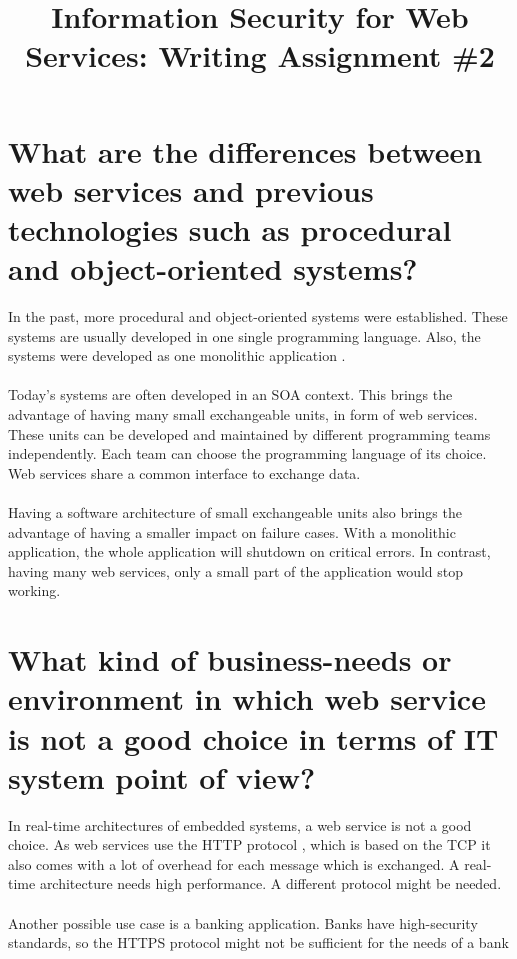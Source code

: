 \documentclass[conference,compsoc,onecolumn]{IEEEtran}
\title{Information Security for Web Services: Writing Assignment \#2}
\author{
  \IEEEauthorblockN{Christoph Stach}
  \IEEEauthorblockA{
    NTUST: National Taiwan University of Science and Technology\\
    Student ID: E10815023\\
    Email: christoph.stach@gmail.com
  }
}
\begin{document}
  \maketitle

  
  \section{What are the differences between web services and previous technologies such as procedural and object-oriented systems?}

    In the past, more procedural and object-oriented systems were established. These systems are usually developed in one single programming language. Also, the systems were developed as one monolithic application \cite{monolitharchitecture}.\\
    \\
    Today's systems are often developed in an SOA context. This brings the advantage of having many small exchangeable units, in form of web services. These units can be developed and maintained by different programming teams independently. Each team can choose the programming language of its choice. Web services share a common interface to exchange data.\\
    \\
    Having a software architecture of small exchangeable units also brings the advantage of having a smaller impact on failure cases. With a monolithic application, the whole application will shutdown on critical errors. In contrast, having many web services, only a small part of the application would stop working.
    
  \section{What kind of business-needs or environment in which web service is not a good choice in terms of IT system point of view?}

    In real-time architectures of embedded systems, a web service is not a good choice. As web services use the HTTP protocol \cite{https}, which is based on the TCP \cite{tcp} it also comes with a lot of overhead for each message which is exchanged. A real-time architecture needs high performance. A different protocol might be needed.\\
    \\
    Another possible use case is a banking application. Banks have high-security standards, so the HTTPS protocol might not be sufficient for the needs of a bank
    
\end{document}
